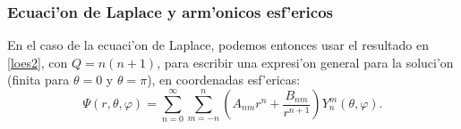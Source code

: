 \subsubsection{Ecuaci'on de Laplace y arm'onicos esf'ericos}
En el caso de la ecuaci'on de Laplace, podemos entonces usar el resultado en \eqref{loes2}, con $Q=n(n+1)$, para escribir una expresi'on general para la soluci'on (finita para $\theta=0$ y $\theta=\pi$), en coordenadas esf'ericas:
\begin{equation}
\Psi(r,\theta,\varphi)=\sum_{n=0}^\infty\sum_{m=-n}^n\left(A_{nm}r^n+\frac{B_{nm}}{r^{n+1}}\right)Y_n^m(\theta,\varphi).
\end{equation}